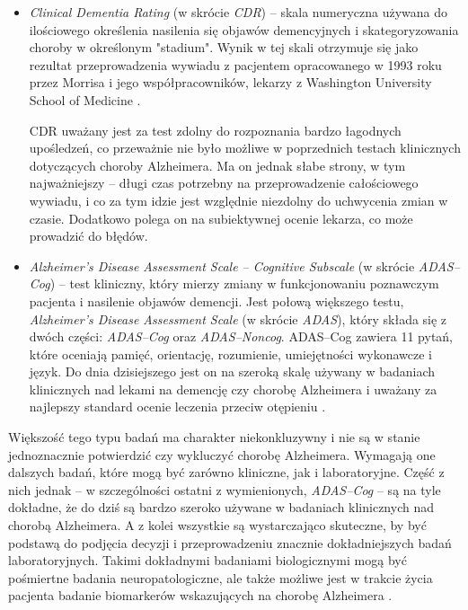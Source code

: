 \begin{itemize}
  \item \emph{Clinical Dementia Rating} (w skrócie \emph{CDR}) -- skala numeryczna używana do ilościowego określenia nasilenia się objawów demencyjnych i skategoryzowania choroby w określonym "stadium".
        Wynik w tej skali otrzymuje się jako rezultat przeprowadzenia wywiadu z pacjentem opracowanego w 1993 roku przez Morrisa i jego współpracowników, lekarzy z Washington University School of Medicine \cite{morris1993clinical}.

        CDR uważany jest za test zdolny do rozpoznania bardzo łagodnych upośledzeń, co przeważnie nie było możliwe w poprzednich testach klinicznych dotyczących choroby Alzheimera.
        Ma on jednak słabe strony, w tym najważniejszy -- długi czas potrzebny na przeprowadzenie całościowego wywiadu, i co za tym idzie jest względnie niezdolny do uchwycenia zmian w czasie.
        Dodatkowo polega on na subiektywnej ocenie lekarza, co może prowadzić do błędów.

  \item \emph{Alzheimer's Disease Assessment Scale -- Cognitive Subscale} (w skrócie \emph{ADAS--Cog}) -- test kliniczny, który mierzy zmiany w funkcjonowaniu poznawczym pacjenta i nasilenie objawów demencji.
        Jest połową większego testu, \emph{Alzheimer's Disease Assessment Scale} (w skrócie \emph{ADAS}), który składa się z dwóch części: \emph{ADAS--Cog} oraz \emph{ADAS--Noncog}.
        ADAS--Cog zawiera 11 pytań, które oceniają pamięć, orientację, rozumienie, umiejętności wykonawcze i język.
        Do dnia dzisiejszego jest on na szeroką skalę używany w badaniach klinicznych nad lekami na demencję czy chorobę Alzheimera i uważany za najlepszy standard  ocenie leczenia przeciw otępieniu \cite{connor2008administration}.

\end{itemize}

Większość tego typu badań ma charakter niekonkluzywny i nie są w stanie jednoznacznie potwierdzić czy wykluczyć chorobę Alzheimera.
Wymagają one dalszych badań, które mogą być zarówno kliniczne, jak i laboratoryjne.
Część z nich jednak -- w szczególności ostatni z wymienionych, \emph{ADAS--Cog} -- są na tyle dokładne, że do dziś są bardzo szeroko używane w badaniach klinicznych nad chorobą Alzheimera.
A z kolei wszystkie są wystarczająco skuteczne, by być podstawą do podjęcia decyzji i przeprowadzeniu znacznie dokładniejszych badań laboratoryjnych.
Takimi dokładnymi badaniami biologicznymi mogą być pośmiertne badania neuropatologiczne, ale także możliwe jest w trakcie życia pacjenta badanie biomarkerów wskazujących na chorobę Alzheimera \cite{mantzavinos2017biomarkers}.

